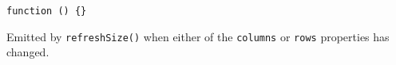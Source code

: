 \texttt{function () \{\}}

Emitted by \texttt{refreshSize()} when either of the \texttt{columns} or
\texttt{rows} properties has changed.

\begin{Shaded}
\begin{Highlighting}[]
\NormalTok{(}\NormalTok{, }\NormalTok{() \{}
  \NormalTok{(}\NormalTok{);}
  \NormalTok{(} \NormalTok{+ } \NormalTok{+ }\NormalTok{);}
\NormalTok{\});}
\end{Highlighting}
\end{Shaded}

